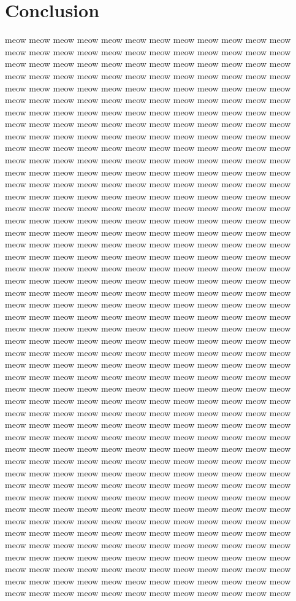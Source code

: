 \section{Conclusion}

meow meow meow meow meow meow meow meow meow meow meow meow meow meow meow meow meow meow meow meow meow meow meow meow meow meow meow meow meow meow meow meow meow meow meow meow meow meow meow meow meow meow meow meow meow meow meow meow meow meow meow meow meow meow meow meow meow meow meow meow meow meow meow meow meow meow meow meow meow meow meow meow meow meow meow meow meow meow meow meow meow meow meow meow meow meow meow meow meow meow meow meow meow meow meow meow meow meow meow meow meow meow meow meow meow meow meow meow meow meow meow meow meow meow meow meow meow meow meow meow meow meow meow meow meow meow meow meow meow meow meow meow meow meow meow meow meow meow meow meow meow meow meow meow meow meow meow meow meow meow meow meow meow meow meow meow meow meow meow meow meow meow meow meow meow meow meow meow meow meow meow meow meow meow meow meow meow meow meow meow meow meow meow meow meow meow meow meow meow meow meow meow meow meow meow meow meow meow meow meow meow meow meow meow meow meow meow meow meow meow meow meow meow meow meow meow meow meow meow meow meow meow meow meow meow meow meow meow meow meow meow meow meow meow meow meow meow meow meow meow meow meow meow meow meow meow meow meow meow meow meow meow meow meow meow meow meow meow meow meow meow meow meow meow meow meow meow meow meow meow meow meow meow meow meow meow meow meow meow meow meow meow meow meow meow meow meow meow meow meow meow meow meow meow meow meow meow meow meow meow meow meow meow meow meow meow meow meow meow meow meow meow meow meow meow meow meow meow meow meow meow meow meow meow meow meow meow meow meow meow meow meow meow meow meow meow meow meow meow meow meow meow meow meow meow meow meow meow meow meow meow meow meow meow meow meow meow meow meow meow meow meow meow meow meow meow meow meow meow meow meow meow meow meow meow meow meow meow meow meow meow meow meow meow meow meow meow meow meow meow meow meow meow meow meow meow meow meow meow meow meow meow meow meow meow meow meow meow meow meow meow meow meow meow meow meow meow meow meow meow meow meow meow meow meow meow meow meow meow meow meow meow meow meow meow meow meow meow meow meow meow meow meow meow meow meow meow meow meow meow meow meow meow meow meow meow meow meow meow meow meow meow meow meow meow meow meow meow meow meow meow meow meow meow meow meow meow meow meow meow meow meow meow meow meow meow meow meow meow meow meow meow meow meow meow meow meow meow meow meow meow meow meow meow meow meow meow meow meow meow meow meow meow meow meow meow meow meow meow meow meow meow meow meow meow meow meow meow meow meow meow meow meow meow meow meow meow meow meow meow meow meow meow meow meow meow meow meow meow meow meow meow meow meow meow meow meow meow meow meow meow meow meow meow 